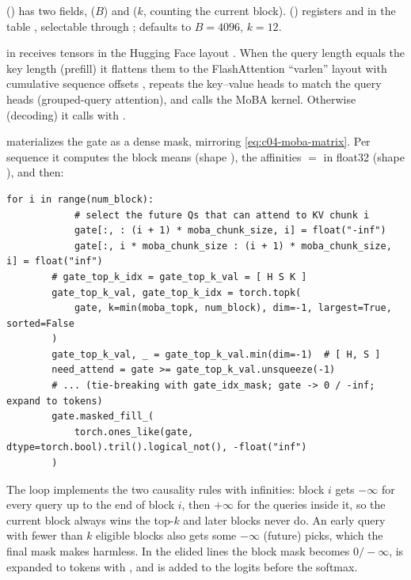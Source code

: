\begin{implnote}[title={In the code: package layout and integration}]
 () has two fields,
 ($B$) and  ($k$, counting the current block).
 () registers
 and  in the  table
, selectable through ;
 defaults to $B=4096$, $k=12$.

 in  receives tensors in the
Hugging Face layout . When the query length equals the key
length (prefill) it flattens them to the FlashAttention ``varlen'' layout
 with cumulative sequence offsets ,
repeats the key--value heads to match the query heads (grouped-query attention), and calls the
MoBA kernel. Otherwise (decoding) it calls  with .
\end{implnote}

\begin{implnote}[title={In the code: the mask-based reference, \texttt{moba\_naive.py}}]
 materializes the gate as a dense mask, mirroring
\eqref{eq:c04-moba-matrix}. Per sequence it computes the block means 
(shape \code{[N, H, D]}), the affinities  $=$  in
float32 (shape \code{[H, S, N]}), and then:
\begin{lstlisting}[caption={Excerpt from \texttt{repos/\allowbreak{}MoonshotAI\_\_MoBA/\allowbreak{}moba/\allowbreak{}moba\_naive.py}},label={lst:c04-moba-naive}]
        for i in range(num_block):
            # select the future Qs that can attend to KV chunk i
            gate[:, : (i + 1) * moba_chunk_size, i] = float("-inf")
            gate[:, i * moba_chunk_size : (i + 1) * moba_chunk_size, i] = float("inf")
        # gate_top_k_idx = gate_top_k_val = [ H S K ]
        gate_top_k_val, gate_top_k_idx = torch.topk(
            gate, k=min(moba_topk, num_block), dim=-1, largest=True, sorted=False
        )
        gate_top_k_val, _ = gate_top_k_val.min(dim=-1)  # [ H, S ]
        need_attend = gate >= gate_top_k_val.unsqueeze(-1)
        # ... (tie-breaking with gate_idx_mask; gate -> 0 / -inf; expand to tokens)
        gate.masked_fill_(
            torch.ones_like(gate, dtype=torch.bool).tril().logical_not(), -float("inf")
        )
\end{lstlisting}
The loop implements the two causality rules with infinities: block $i$ gets $-\infty$ for every
query up to the end of block $i$, then $+\infty$ for the queries inside it, so the current block
always wins the top-$k$ and later blocks never do. An early query with fewer than $k$ eligible
blocks also gets some $-\infty$ (future) picks, which the final  mask makes harmless. In the elided lines the block mask becomes $0/-\infty$, is expanded to tokens
with , and is added to the logits before the softmax.
\end{implnote}


